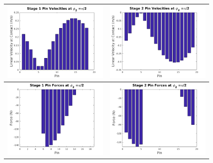 \begin{figure}[!t]
   \centering
   \begin{tabular}{cc}
	   \includegraphics[width=0.50\columnwidth]{fig/double_1_neg_vel_pi_2} &
	   \includegraphics[width=0.50\columnwidth]{fig/double_2_neg_vel_pi_2} \\
	   
	   \hline
	   
	   \includegraphics[width=0.50\columnwidth]{fig/double_1_neg_forces_pi_2} &
	   \includegraphics[width=0.50\columnwidth]{fig/double_2_neg_forces_pi_2} \\
	   

\end{tabular}
\end{figure}
